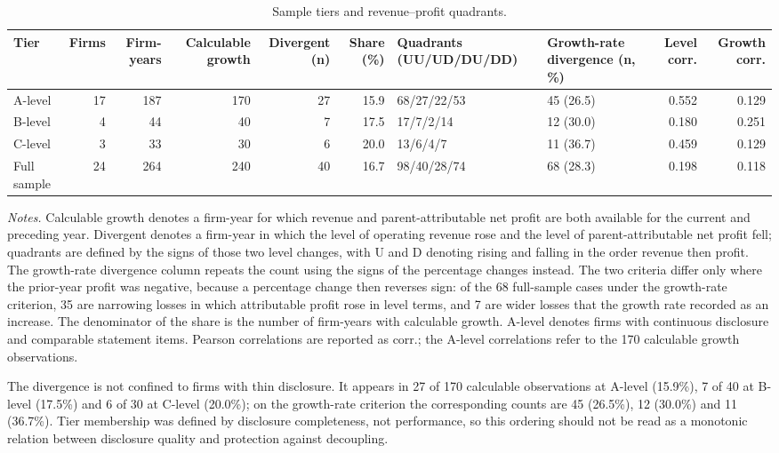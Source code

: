 \documentclass[review,3p,times]{elsarticle}
\begin{document}
\begin{table}[!htbp]
\centering
\caption{Sample tiers and revenue--profit quadrants.}\label{tab:1}
\begin{minipage}{\textwidth}
\centering
\footnotesize
\begin{adjustbox}{max width=\textwidth}
\begin{tabular}{@{}lrrrrrllrr@{}}
\toprule
Tier & Firms & Firm-years & Calculable growth & Divergent (n) & Share (\%) & Quadrants (UU/UD/DU/DD) & Growth-rate divergence (n, \%) & Level corr. & Growth corr. \\
\midrule
A-level & 17 & 187 & 170 & 27 & 15.9 & 68/27/22/53 & 45 (26.5) & 0.552 & 0.129 \\
B-level & 4 & 44 & 40 & 7 & 17.5 & 17/7/2/14 & 12 (30.0) & 0.180 & 0.251 \\
C-level & 3 & 33 & 30 & 6 & 20.0 & 13/6/4/7 & 11 (36.7) & 0.459 & 0.129 \\
Full sample & 24 & 264 & 240 & 40 & 16.7 & 98/40/28/74 & 68 (28.3) & 0.198 & 0.118 \\
\bottomrule
\end{tabular}
\end{adjustbox}
\par\medskip
\raggedright
\noindent\textit{Notes.} Calculable growth denotes a firm-year for which revenue and parent-attributable net profit are both available for the current and preceding year. Divergent denotes a firm-year in which the level of operating revenue rose and the level of parent-attributable net profit fell; quadrants are defined by the signs of those two level changes, with U and D denoting rising and falling in the order revenue then profit. The growth-rate divergence column repeats the count using the signs of the percentage changes instead. The two criteria differ only where the prior-year profit was negative, because a percentage change then reverses sign: of the 68 full-sample cases under the growth-rate criterion, 35 are narrowing losses in which attributable profit rose in level terms, and 7 are wider losses that the growth rate recorded as an increase. The denominator of the share is the number of firm-years with calculable growth. A-level denotes firms with continuous disclosure and comparable statement items. Pearson correlations are reported as corr.; the A-level correlations refer to the 170 calculable growth observations.
\end{minipage}
\end{table}

The divergence is not confined to firms with thin disclosure. It appears in 27 of 170 calculable observations at A-level (15.9\%), 7 of 40 at B-level (17.5\%) and 6 of 30 at C-level (20.0\%); on the growth-rate criterion the corresponding counts are 45 (26.5\%), 12 (30.0\%) and 11 (36.7\%). Tier membership was defined by disclosure completeness, not performance, so this ordering should not be read as a monotonic relation between disclosure quality and protection against decoupling.
\end{document}
